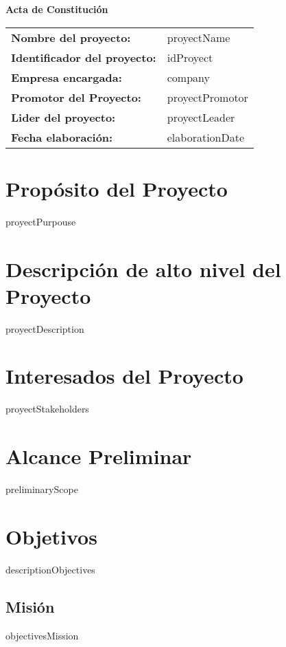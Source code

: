 \documentclass[12pt]{article}
\begin{document}
    \begin{center}
    {\huge\textbf{Acta de Constitución}}\\[13cm]
    \end{center}

    \begin{tabular}{ll}
        \textbf{Nombre del proyecto:} & {{proyectName}} \\[0.3cm]
        \textbf{Identificador del proyecto:} & {{idProyect}} \\[0.3cm]
        \textbf{Empresa encargada:} & {{company}} \\[0.3cm]
        \textbf{Promotor del Proyecto:} & {{proyectPromotor}} \\[0.3cm]
        \textbf{Lider del proyecto:} & {{proyectLeader}} \\[0.3cm]
        \textbf{Fecha elaboración:} & {{elaborationDate}} \\
    \end{tabular}
    \newpage

    \tableofcontents
    \newpage

    \section{Propósito del Proyecto}
    {{proyectPurpouse}}

    \section{Descripción de alto nivel del Proyecto}
    {{proyectDescription}}

    \section{Interesados del Proyecto}
    {{proyectStakeholders}}

    \section{Alcance Preliminar}
    {{preliminaryScope}}

    \section{Objetivos}
    {{descriptionObjectives}}
    \subsection{Misión}
    {{objectivesMission}}
\end{document}
